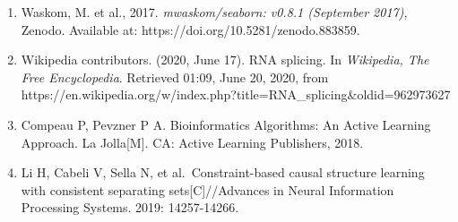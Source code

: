 \documentclass[11pt]{article}
\makeatletter
\newcommand{\boxspacing}{\kern\kvtcb@left@rule\kern\kvtcb@boxsep}
\newcommand{\prompt}[4]{
        \ttfamily\llap{{\color{#2}[#3]:\hspace{3pt}#4}}\vspace{-\baselineskip}
    }
\makeatother
\begin{document}
\begin{enumerate}
\item
  Waskom, M. et al., 2017. \emph{mwaskom/seaborn: v0.8.1 (September
  2017)}, Zenodo. Available at: https://doi.org/10.5281/zenodo.883859.
\item
  Wikipedia contributors. (2020, June 17). RNA splicing. In
  \emph{Wikipedia, The Free Encyclopedia}. Retrieved 01:09, June 20,
  2020, from
  https://en.wikipedia.org/w/index.php?title=RNA\_splicing\&oldid=962973627
\item
  Compeau P, Pevzner P A. Bioinformatics Algorithms: An Active Learning
  Approach. La Jolla{[}M{]}. CA: Active Learning Publishers, 2018.
\item
  Li H, Cabeli V, Sella N, et al.~Constraint-based causal structure
  learning with consistent separating sets{[}C{]}//Advances in Neural
  Information Processing Systems. 2019: 14257-14266.
\end{enumerate}

    \begin{tcolorbox}[breakable, size=fbox, boxrule=1pt, pad at break*=1mm,colback=cellbackground, colframe=cellborder]
\prompt{In}{incolor}{ }{\boxspacing}
\begin{Verbatim}[commandchars=\\\{\},fontsize=\small]

\end{Verbatim}
\end{tcolorbox}


    
    
    
\end{document}

